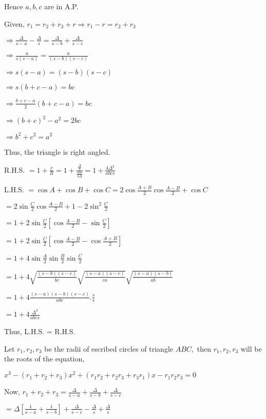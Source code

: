   Hence $a,b,c$ are in A.P.

\item Given, $r_1 = r_2 + r_3 + r \Rightarrow r_1 - r = r_2 + r_3$

  $\Rightarrow \frac{\Delta}{s - a} - \frac{\Delta}{s} = \frac{\Delta}{s - b} + \frac{\Delta}{s - c}$

  $\Rightarrow \frac{a}{s(s - a)} = \frac{a}{(s - b)(s - c)}$

  $\Rightarrow s(s - a) = (s - b)(s - c)$

  $\Rightarrow s(b + c - a) = bc$

  $\Rightarrow \frac{b + c - a}{2}(b + c - a) = bc$

  $\Rightarrow (b + c)^2 - a^2 = 2bc$

  $\Rightarrow b^2 + c^2 = a^2$

  Thus, the triangle is right angled.

\item R.H.S. $= 1 + \frac{r}{R} = 1 + \frac{\frac{\Delta}{s}}{\frac{abc}{4\Delta}} = 1 + \frac{4\Delta^2}{abcs}$

  L.H.S. $= \cos A + \cos B + \cos C = 2\cos\frac{A + B}{2}\cos\frac{A - B}{2} + \cos C$

  $= 2\sin\frac{C}{2}\cos\frac{A - B}{2} + 1 - 2\sin^2\frac{C}{2}$

  $= 1 + 2\sin\frac{C}{2}\left[\cos\frac{A - B}{2} - \sin\frac{C}{2}\right]$

  $= 1 + 2\sin\frac{C}{2}\left[\cos\frac{A - B}{2} - \cos\frac{A + B}{2}\right]$

  $= 1 + 4\sin\frac{A}{2}\sin\frac{B}{2}\sin\frac{C}{2}$

  $= 1 + 4\sqrt{\frac{(s - b)(s - c)}{bc}}\sqrt{\frac{(s - a)(s - c)}{ca}}\sqrt{\frac{(s - a)(s - b)}{ab}}$

  $= 1 + 4\frac{(s - a)(s - b)(s - c)}{abc}.\frac{s}{s}$

  $= 1 + 4\frac{\Delta^2}{abcs}$

  Thus, L.H.S. = R.H.S.

\item Let $r_1, r_2, r_3$ be the radii of escribed circles of triangle $ABC,$ then $r_1, r_2, r_3$ will be the
  roots of the equation,

  $x^3 - (r_1 + r_2 + r_3)x^2 + (r_1r_2 + r_2r_3 + r_3r_1)x - r_1r_2r_3 = 0$

  Now, $r_1 + r_2 + r_3 = \frac{\Delta}{s - a} + \frac{\Delta}{s - b} + \frac{\Delta}{s - c}$

  $= \Delta\left[\frac{1}{s - a} + \frac{1}{s - b}\right] + \frac{\Delta}{s - c} - \frac{\Delta}{s} + \frac{\Delta}{s}$


